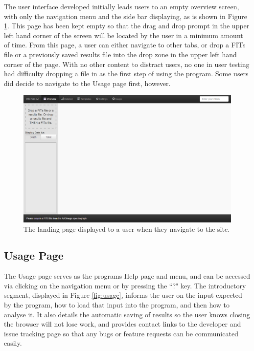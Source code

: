 \documentclass[titlesmallcaps, examinerscopy, copyrightpage]{uqthesis}
\begin{document}
The user interface developed initially leads users to an empty overview screen, with only the navigation menu and the side bar displaying, as is shown in Figure \ref{fig:empty}. This page has been kept empty so that the drag and drop prompt in the upper left hand corner of the screen will be located by the user in a minimum amount of time. From this page, a user can either navigate to other tabs, or drop a FITs file or a previously saved results file into the drop zone in the upper left hand corner of the page. With no other content to distract users, no one in user testing had difficulty dropping a file in as the first step of using the program. Some users did decide to navigate to the Usage page first, however.

\begin{figure}[ht!]
\includegraphics[width=1\textwidth]{images/empty.png} 
\centering
\caption{The landing page displayed to a user when they navigate to the site.}
\label{fig:empty}
\end{figure}



\subsection{Usage Page}

The Usage page serves as the programs Help page and menu, and can be accessed via clicking on the navigation menu or by pressing the ``?" key. The introductory segment, displayed in Figure \ref{fig:usage}, informs the user on the input expected by the program, how to load that input into the program, and then how to analyse it. It also details the automatic saving of results so the user knows closing the browser will not lose work, and provides contact links to the developer and issue tracking page so that any bugs or feature requests can be communicated easily.
\end{document}
